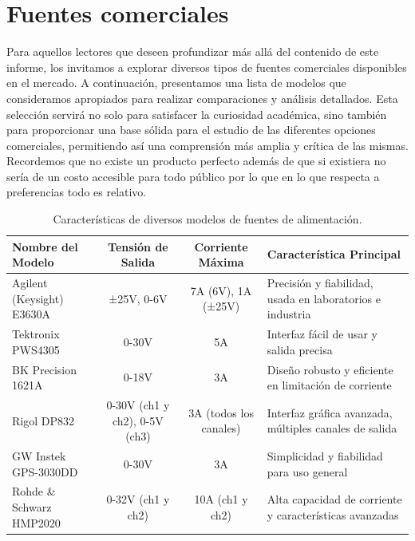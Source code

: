 \section{Fuentes comerciales}
Para aquellos lectores que deseen profundizar más allá del contenido de este informe, los invitamos a explorar diversos tipos de fuentes comerciales disponibles en el mercado. A continuación, presentamos una lista de modelos que consideramos apropiados para realizar comparaciones y análisis detallados. Esta selección servirá no solo para satisfacer la curiosidad académica, sino también para proporcionar una base sólida para el estudio de las diferentes opciones comerciales, permitiendo así una comprensión más amplia y crítica de las mismas. Recordemos que no existe un producto perfecto además de que si existiera no sería de un costo accesible para todo público por lo que en lo que respecta a  preferencias todo es relativo.
\begin{table}[h!]
    \centering
    \caption{Características de diversos modelos de fuentes de alimentación.}
    \label{tab:fuentes_alimentacion}
    \begin{tabular}{|l|c|c|l|}
        \hline
        \textbf{Nombre del Modelo} & \textbf{Tensión de Salida} & \textbf{Corriente Máxima} & \textbf{Característica Principal} \\ \hline \hline
        Agilent (Keysight) E3630A & ±25V, 0-6V & 7A (6V), 1A (±25V) & Precisión y fiabilidad, usada en laboratorios e industria \\ \hline
        Tektronix PWS4305 & 0-30V & 5A & Interfaz fácil de usar y salida precisa \\ \hline
        BK Precision 1621A & 0-18V & 3A & Diseño robusto y eficiente en limitación de corriente \\ \hline
        Rigol DP832 & 0-30V (ch1 y ch2), 0-5V (ch3) & 3A (todos los canales) & Interfaz gráfica avanzada, múltiples canales de salida \\ \hline
        GW Instek GPS-3030DD & 0-30V & 3A & Simplicidad y fiabilidad para uso general \\ \hline
        Rohde \& Schwarz HMP2020 & 0-32V (ch1 y ch2) & 10A (ch1 y ch2) & Alta capacidad de corriente y características avanzadas \\ \hline
    \end{tabular}
\end{table}




